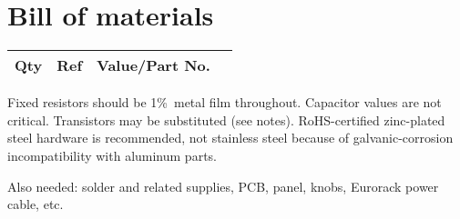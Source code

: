 
%
%
%
%
%
%

\onecolumn
\chapter{Bill of materials}\label{cha:bom}

{\centering
{}

\begin{longtable}{rp{1in}cp{3in}}
  \textbf{Qty} & \textbf{Ref} & \textbf{Value/Part No.} & \\ \hline \endhead

\end{longtable}\par}

Fixed resistors should be 1\%\ metal film throughout.  Capacitor values
are not critical.  Transistors may be substituted (see notes).
RoHS-certified zinc-plated steel hardware is recommended, not stainless
steel because of galvanic-corrosion incompatibility with aluminum parts.

Also needed:  solder and related supplies, PCB, panel, knobs, Eurorack power
cable, etc.

\twocolumn
